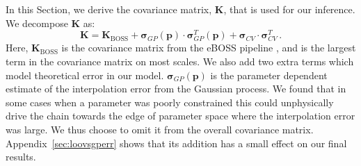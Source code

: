 In this Section, we derive the covariance matrix, $\boldsymbol{K}$, that is used for our inference.
We decompose $\boldsymbol{K}$ as:
\begin{equation}
    \boldsymbol{K} = \boldsymbol{K}_\mathrm{BOSS} + \boldsymbol{\sigma}_{GP}(\boldsymbol{p}) \cdot \boldsymbol{\sigma}_{GP}^T (\boldsymbol{p}) + \boldsymbol{\sigma}_{CV} \cdot \boldsymbol{\sigma}_{CV}^T \,.
    \label{eq:covariance}
\end{equation}
Here, $\boldsymbol{K}_\mathrm{BOSS}$ is the covariance matrix from the eBOSS pipeline \cite{2019JCAP...07..017C}, and is the largest term in the covariance matrix on most scales.
We also add two extra terms which model theoretical error in our model.
$\boldsymbol{\sigma}_{GP}(\boldsymbol{p})$ is the parameter dependent estimate of the interpolation error from the Gaussian process.
We found that in some cases when a parameter was poorly constrained this could unphysically drive the chain towards the edge of parameter space where the interpolation error was large.
We thus choose to omit it from the overall covariance matrix.
Appendix~\ref{sec:loovsgperr} shows that its addition has a small effect on our final results.

